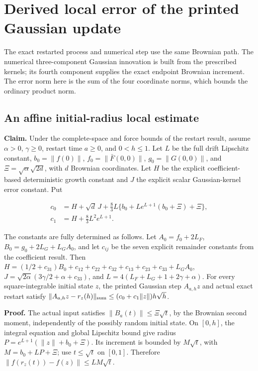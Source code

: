\documentclass[11pt,a4paper]{report}
\begin{document}
\section{\texorpdfstring{Derived local error of the printed Gaussian update}{Derived local error of the printed Gaussian update}}


The exact restarted process and numerical step use the same Brownian path. The numerical three-component Gaussian innovation is built from the prescribed kernels; its fourth component supplies the exact endpoint Brownian increment. The error norm here is the sum of the four coordinate norms, which bounds the ordinary product norm.

\subsection{\texorpdfstring{An affine initial-radius local estimate}{An affine initial-radius local estimate}}


\textbf{Claim.} Under the complete-space and force bounds of the restart result, assume \(\alpha>0\), \(\gamma\ge0\), restart time \(a\ge0\), and \(0<h\le1\). Let \(L\) be the full drift Lipschitz constant, \(b_0=\|f(0)\|\), \(f_0=\|\bar F(0,0)\|\), \(g_0=\|G(0,0)\|\), and \(\Xi=\sqrt\alpha\sqrt{2d}\), with \(d\) Brownian coordinates. Let \(H\) be the explicit coefficient-based deterministic growth constant and \(J\) the explicit scalar Gaussian-kernel error constant. Put

\[\begin{aligned}c_0&=H+\sqrt d\,J+\tfrac83L\{b_0+Le^{L+1}(b_0+\Xi)+\Xi\},\\c_1&=H+\tfrac83L^2e^{L+1}.\end{aligned}\]

The constants are fully determined as follows. Let \(A_0=f_0+2L_F\), \(B_0=g_0+2L_G+L_GA_0\), and let \(c_{ij}\) be the seven explicit remainder constants from the coefficient result. Then \(H=(1/2+c_{31})B_0+c_{12}+c_{22}+c_{32}+c_{13}+c_{23}+c_{33}+L_GA_0\), \(J=\sqrt{2\alpha}(3\gamma/2+\alpha+c_{33})\), and \(L=4(L_F+L_G+1+2\gamma+\alpha)\). For every square-integrable initial state \(z\), the printed Gaussian step \(A_{a,h}z\) and actual exact restart satisfy \(\|A_{a,h}z-r_z(h)\|_{\rm sum}\le(c_0+c_1\|z\|)h\sqrt h\).



\textbf{Proof.} The actual input satisfies \(\|B_a(t)\|\le\Xi\sqrt t\), by the Brownian second moment, independently of the possibly random initial state. On \([0,h]\), the integral equation and global Lipschitz bound give radius \(P=e^{L+1}(\|z\|+b_0+\Xi)\). Its increment is bounded by \(M\sqrt t\), with \(M=b_0+LP+\Xi\); use \(t\le\sqrt t\) on \([0,1]\). Therefore \(\|f(r_z(t))-f(z)\|\le LM\sqrt t\).
\end{document}
